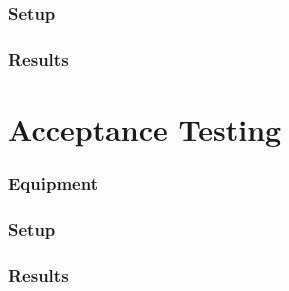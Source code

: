 \subsubsection{Setup}

\subsubsection{Results}
 
\section{Acceptance Testing}
 
\subsubsection{Equipment}
 
\subsubsection{Setup}
 
\subsubsection{Results}
 




